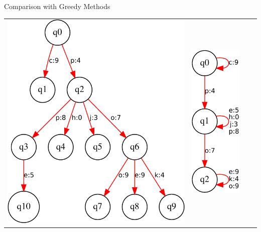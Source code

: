 \begin{tframe}{Comparison with Greedy Methods}
\begin{center}
\begin{tabular}{cccc}
\includegraphics[scale=0.4]{media_minrep/orig}&
\includegraphics[scale=0.4]{media_minrep/censi}&

\end{tabular}
\end{center}
\end{tframe}

